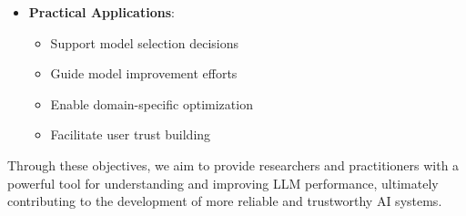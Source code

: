 \begin{itemize}
    \item \textbf{Practical Applications}:
    \begin{itemize}
        \item Support model selection decisions
        \item Guide model improvement efforts
        \item Enable domain-specific optimization
        \item Facilitate user trust building
    \end{itemize}
\end{itemize}

\vspace{0.5em}
Through these objectives, we aim to provide researchers and practitioners with a powerful tool for understanding and improving LLM performance, ultimately contributing to the development of more reliable and trustworthy AI systems.
